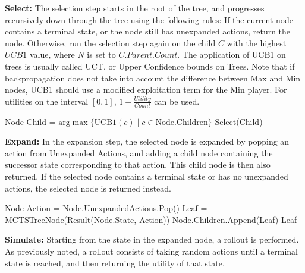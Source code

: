 \textbf{Select:} The selection step starts in the root of the tree,
and progresses recursively down through the tree using the following
rules: If the current node contains a terminal state, or the node still has unexpanded actions, return the node. Otherwise, run the selection
step again on the child $C$ with the highest $UCB1$ value, where $N$ is set to $C.Parent.Count$. The application of UCB1 on trees is usually called UCT, or Upper Confidence bounds on Trees.
Note that if backpropagation does not take into account the difference
between Max and Min nodes, UCB1 should use a modified exploitation term 
for the Min player. For utilities on the interval $[0,1]$, 
$1 - \frac{Utility}{Count}$ can be used.
\begin{algorithm}
    \begin{algorithmic}[1]
                \State \Return Node
            \EndIf
            \State Child = 
            $\text{arg}\max \{ \text{UCB1}(c) \;|\; c \in \text{Node.Children} \}$ 
            \State \Return Select(Child)
        \EndProcedure
    \end{algorithmic}        
\end{algorithm}

\textbf{Expand:} In the expansion step, the selected node is expanded by 
popping an action from Unexpanded Actions, and adding a child 
node containing the successor state corresponding to that action. This
child node is then also returned. If the selected node contains a terminal 
state or has no unexpanded actions, the selected node is returned instead.

\begin{algorithm}[H]
    \begin{algorithmic}[1]
                \State \Return Node
            \EndIf
            \State Action = Node.UnexpandedActions.Pop()
            \State Leaf = MCTSTreeNode(Result(Node.State, Action))
            \State Node.Children.Append(Leaf)
            \State \Return Leaf
        \EndProcedure
    \end{algorithmic}    
\end{algorithm}


\textbf{Simulate:} Starting from the state in the expanded node, a rollout
is performed. As previously noted, a rollout consists of taking random
actions until a terminal state is reached, and then returning the utility
of that state.

